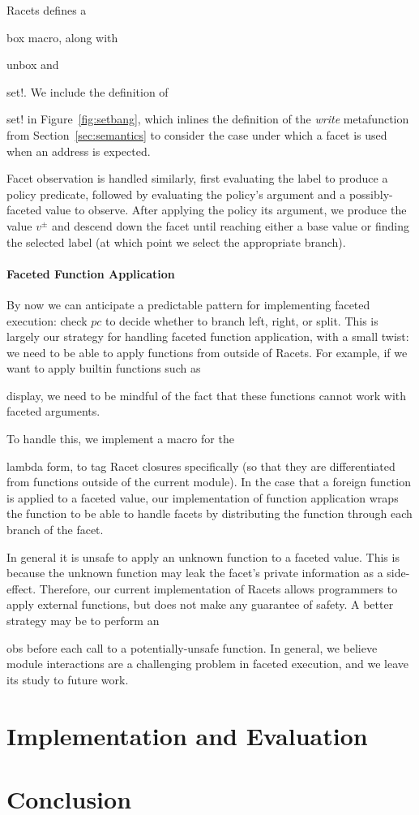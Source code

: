 \documentclass[review=true,acmlarge]{acmart}
\newcommand*{\SavedLstInline}{}
\DeclareRobustCommand*{\lstinline}{%
  \ifmmode
    \let\SavedBGroup\bgroup
    \def\bgroup{%
      \let\bgroup\SavedBGroup
      \hbox\bgroup
    }%
  \fi
  \SavedLstInline
}
\newcommand{\colorMATH}{black!20!blue}
\newcommand{\bmth}[1] {{\color{\colorMATH} $#1$}}
\newcommand{\code}[1]{\lstinline{#1}}
\begin{document}
Racets defines a \code{box} macro, along with \code{unbox} and
\code{set!}. We include the definition of \code{set!} in
Figure~\ref{fig:setbang}, which inlines the definition of the
\textit{write} metafunction from Section~\ref{sec:semantics} to
consider the case under which a facet is used when an address is
expected.

Facet observation is handled similarly, first evaluating the label to
produce a policy predicate, followed by evaluating the policy's
argument and a possibly-faceted value to observe. After applying the
policy its argument, we produce the value \bmth{v^{\pm}} and descend
down the facet until reaching either a base value or finding the
selected label (at which point we select the appropriate branch).

\paragraph*{Faceted Function Application}

By now we can anticipate a predictable pattern for implementing
faceted execution: check \bmth{pc} to decide whether to branch left,
right, or split. This is largely our strategy for handling faceted
function application, with a small twist: we need to be able to apply
functions from outside of Racets. For example, if we want to apply
builtin functions such as \code{display}, we need to be mindful of the
fact that these functions cannot work with faceted arguments.

To handle this, we implement a macro for the \code{lambda} form, to
tag Racet closures specifically (so that they are differentiated from
functions outside of the current module). In the case that a foreign
function is applied to a faceted value, our implementation of function
application wraps the function to be able to handle facets by
distributing the function through each branch of the facet.

In general it is unsafe to apply an unknown function to a faceted
value. This is because the unknown function may leak the facet's
private information as a side-effect. Therefore, our current
implementation of Racets allows programmers to apply external
functions, but does not make any guarantee of safety. A better
strategy may be to perform an \code{obs} before each call to a
potentially-unsafe function. In general, we believe module
interactions are a challenging problem in faceted execution, and we
leave its study to future work.

\section{Implementation and Evaluation}

\section{Conclusion}



\end{document}
